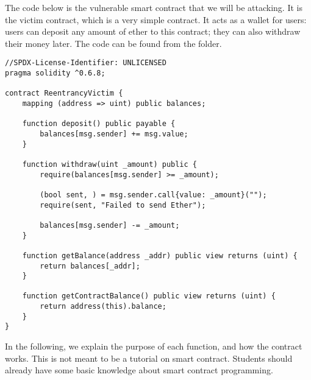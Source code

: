 The code below is the vulnerable smart contract that we will be attacking. 
It is the victim contract, which is a very simple contract. 
It acts as a wallet for users: users can deposit any amount of ether to 
this contract; they can also withdraw their money later.
The code can be found from the  folder. 

\begin{lstlisting}[language=Solidity, 
      caption={The vulnerable smart contract (\texttt{ReentrancyVictim.sol})}]
//SPDX-License-Identifier: UNLICENSED
pragma solidity ^0.6.8;

contract ReentrancyVictim {
    mapping (address => uint) public balances;

    function deposit() public payable {
        balances[msg.sender] += msg.value;
    }

    function withdraw(uint _amount) public {
        require(balances[msg.sender] >= _amount);

        (bool sent, ) = msg.sender.call{value: _amount}("");
        require(sent, "Failed to send Ether");

        balances[msg.sender] -= _amount;
    }

    function getBalance(address _addr) public view returns (uint) {
        return balances[_addr];
    }

    function getContractBalance() public view returns (uint) {
        return address(this).balance;
    }
}
\end{lstlisting}

In the following, we explain the purpose of each function, and  
how the contract works. This is not meant to be a tutorial on 
smart contract. Students should already have some basic knowledge
about smart contract programming. 

